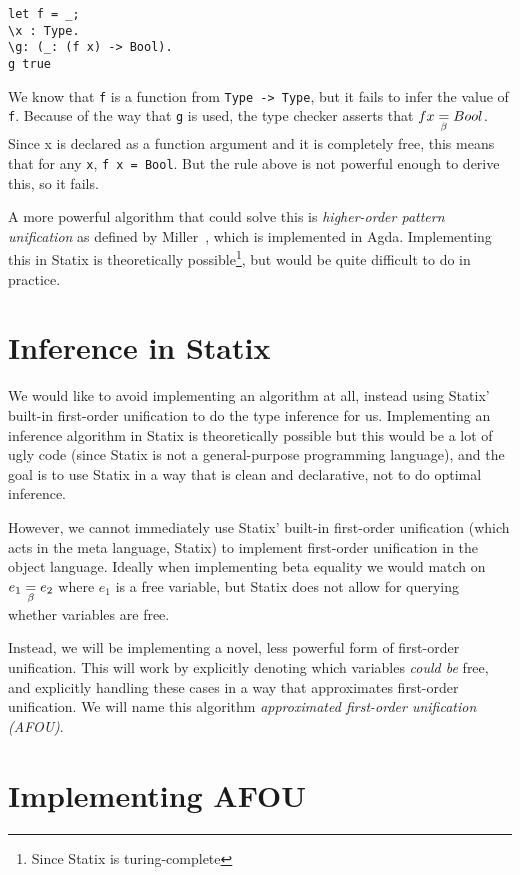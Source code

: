 \begin{lstlisting}
let f = _;
\x : Type.
\g: (_: (f x) -> Bool).
g true
\end{lstlisting}

We know that \verb|f| is a function from \verb|Type -> Type|, but it fails to infer the value of \verb|f|. Because of the way that \verb|g| is used, the type checker asserts that $f x \underset{\beta}{=} Bool$. Since x is declared as a function argument and it is completely free, this means that for any \verb|x|, \verb|f x = Bool|. But the rule above is not powerful enough to derive this, so it fails.

A more powerful algorithm that could solve this is \emph{higher-order pattern unification} as defined by Miller~\cite{Miller89}, which is implemented in Agda. Implementing this in Statix is theoretically possible\footnote{Since Statix is turing-complete}, but would be quite difficult to do in practice.

\section{Inference in Statix}
\label{statix-inference}

We would like to avoid implementing an algorithm at all, instead using Statix' built-in first-order unification to do the type inference for us. Implementing an inference algorithm in Statix is theoretically possible but this would be a lot of ugly code (since Statix is not a general-purpose programming language), and the goal is to use Statix in a way that is clean and declarative, not to do optimal inference.

However, we cannot immediately use Statix' built-in first-order unification (which acts in the meta language, Statix) to implement first-order unification in the object language. Ideally when implementing beta equality we would match on $e_1 \underset{\beta}{=} e_2$ where $e_1$ is a free variable, but Statix does not allow for querying whether variables are free. 

Instead, we will be implementing a novel, less powerful form of first-order unification. This will work by explicitly denoting which variables \emph{could be} free, and explicitly handling these cases in a way that approximates first-order unification. We will name this algorithm \emph{approximated first-order unification (AFOU)}.

\section{Implementing AFOU} 
\label{implementing-inference}


